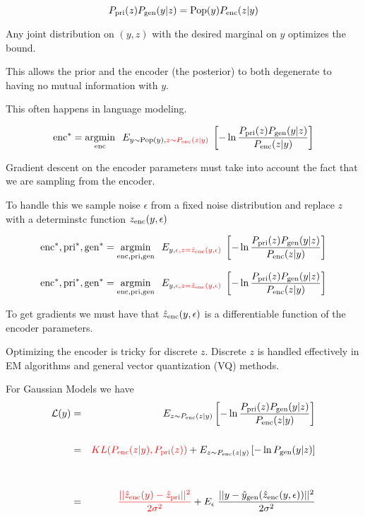 {


{\color{red} $$P_{\mathrm{pri}}(z)P_{\mathrm{gen}}(y|z) = \mathrm{Pop}(y)P_{\mathrm{enc}}(z|y)$$}

\vfill
Any joint distribution on $(y,z)$ with the desired marginal on $y$ optimizes the bound.

\vfill
This allows the prior and the encoder (the posterior) to both degenerate to having no mutual information with $y$.

\vfill
This often happens in language modeling.


$$\mathrm{enc}^* = \operatorname*{argmin}_{\mathrm{enc}}\;\;E_{y\sim \mathrm{Pop}(y),{\color{red} z\sim P_{\mathrm{enc}}(z|y)}}\;\left[- \ln \frac{P_{\mathrm{pri}}(z)P_{\mathrm{gen}}(y|z)}{P_{\mathrm{enc}}(z|y)}\right]$$

\vfill
Gradient descent on the encoder parameters must take into account the fact that we are sampling from the encoder.

\vfill
To handle this we sample noise $\epsilon$ from a fixed noise distribution and replace $z$ with a determinstc function $z_{\mathrm{enc}}(y,\epsilon)$

\vfill
$$\mathrm{enc}^*,\mathrm{pri}^*,\mathrm{gen}^* = \operatorname*{argmin}_{\mathrm{enc},\mathrm{pri},\mathrm{gen}}\;\;E_{y,{\color{red} \epsilon,z=\hat{z}_{\mathrm{enc}}(y,\epsilon)}}\;\left[- \ln \frac{P_{\mathrm{pri}}(z)P_{\mathrm{gen}}(y|z)}{P_{\mathrm{enc}}(z|y)}\right]$$


$$\mathrm{enc}^*,\mathrm{pri}^*,\mathrm{gen}^* = \operatorname*{argmin}_{\mathrm{enc},\mathrm{pri},\mathrm{gen}}\;\;E_{y,{\color{red} \epsilon,z=\hat{z}_{\mathrm{enc}}(y,\epsilon)}}\;\left[- \ln \frac{P_{\mathrm{pri}}(z)P_{\mathrm{gen}}(y|z)}{P_{\mathrm{enc}}(z|y)}\right]$$

\vfill
To get gradients we must have that $\hat{z}_{\mathrm{enc}}(y,\epsilon)$ is a differentiable function of the encoder parameters.

\vfill
Optimizing the encoder is tricky for discrete $z$.  Discrete $z$ is handled effectively in EM algorithms and general vector quantization (VQ) methods.

{\huge
For Gaussian Models we have
\vfill
\begin{eqnarray*}
{\cal L}(y) & = & E_{z \sim P_{\mathrm{enc}}(z|y)}\left[ - \ln \frac{P_{\mathrm{pri}}(z)P_{\mathrm{gen}}(y|z)}{P_{\mathrm{enc}}(z|y)}\right] \\
\\
& = & {\color{red} KL(P_{\mathrm{enc}}(z|y),P_{\mathrm{pri}}(z))} + E_{z \sim P_{\mathrm{enc}}(z|y)}\left[- \ln P_{\mathrm{gen}}(y|z)\right] \\
\\
\\
&=& {\color{red} \frac{||\hat{z}_{\mathrm{enc}}(y) - \hat{z}_{\mathrm{pri}}||^2}{2\sigma^2}} + E_\epsilon\;\frac{||y - \hat{y}_{\mathrm{gen}}(\hat{z}_{\mathrm{enc}}(y,\epsilon))||^2}{2\sigma^2}
\end{eqnarray*}

}}
